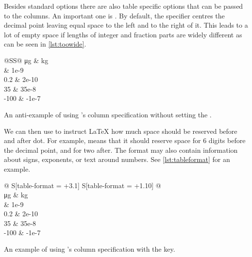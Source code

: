 Besides standard options there are also table specific options that can be
passed to the columns. An important one is . By default, the
 specifier centres the decimal point leaving equal space to the left
and to the right of it. This leads to a lot of empty space if lengths of
integer and fraction parts are widely different as can be seen in
\autoref{lst:toowide}.
\begin{listing}
  \begin{example}[examplewidth=0.7\linewidth, vertical_mode]
\begin{tabular} {@{}SS@{}}
  \toprule
  {\unit{\ug}} & {\unit{\kg}} \\
   & 1e-9 \\
  0.2 & 2e-10 \\
  35 & 35e-8 \\
  -100 & -1e-7 \\
  \bottomrule
\end{tabular}
\end{example}
  \caption{An anti-example of using 's  column
    specification without setting the .}\label{lst:toowide}
\end{listing}
We can then use
 to instruct \LaTeX{} how much space should be reserved
before and after dot. For example,  means that it should reserve
space for 6 digits before the decimal point, and for two after. The format may
also contain information about signs, exponents, or text around numbers. See
\autoref{lst:tableformat} for an example.
\begin{listing}
  \begin{example}[examplewidth=0.7\linewidth, vertical_mode]
\begin{tabular} {
    @{}
    S[table-format = +3.1]
    S[table-format = +1.10]
    @{}
  }
  \toprule
   \\
  \midrule
  {\unit{\ug}} & {\unit{\kg}} \\
   & 1e-9 \\
  0.2 & 2e-10 \\
  35 & 35e-8 \\
  -100 & -1e-7 \\
  \bottomrule
\end{tabular}
\end{example}
  \caption{An example of using 's  column
    specification with the  key.}\label{lst:tableformat}
\end{listing}

